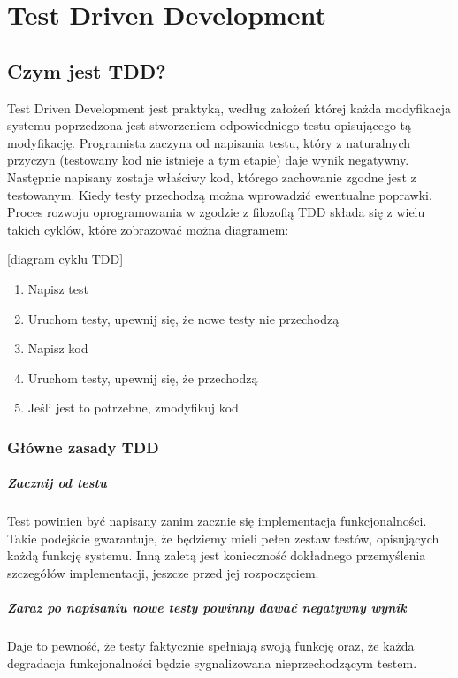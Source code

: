 \chapter[Test Driven Development]{Test Driven Development}
  \section{Czym jest TDD?}
    Test Driven Development jest praktyką, według założeń której każda modyfikacja systemu poprzedzona jest stworzeniem odpowiedniego testu opisującego tą modyfikację. Programista zaczyna od napisania testu, który z naturalnych przyczyn (testowany kod nie istnieje a tym etapie) daje wynik negatywny. Następnie napisany zostaje właściwy kod, którego zachowanie zgodne jest z testowanym. Kiedy testy przechodzą można wprowadzić ewentualne poprawki.
    Proces rozwoju oprogramowania w zgodzie z filozofią TDD składa się z wielu takich cyklów, które zobrazować można diagramem:
    
    [diagram cyklu TDD]
    \begin{enumerate}
      \item Napisz test
      \item Uruchom testy, upewnij się, że nowe testy nie przechodzą
      \item Napisz kod 
      \item Uruchom testy, upewnij się, że przechodzą
      \item Jeśli jest to potrzebne, zmodyfikuj kod
    \end{enumerate}
  \subsection{Główne zasady TDD}
    \paragraph{Zacznij od testu}
      Test powinien być napisany zanim zacznie się implementacja funkcjonalności. Takie podejście gwarantuje, że będziemy mieli pełen zestaw testów, opisujących każdą funkcję systemu. Inną zaletą jest konieczność dokładnego przemyślenia szczegółów implementacji, jeszcze przed jej rozpoczęciem.
    \paragraph{Zaraz po napisaniu nowe testy powinny dawać negatywny wynik}
      Daje to pewność, że testy faktycznie spełniają swoją funkcję oraz, że każda degradacja funkcjonalności będzie sygnalizowana nieprzechodzącym testem.
